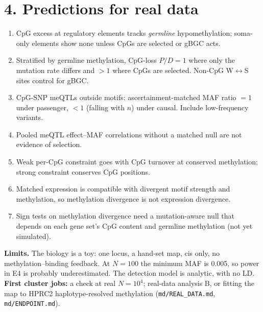 \documentclass[10pt]{article}
\begin{document}
\section*{4. Predictions for real data}
\begin{enumerate}[label=R\arabic*.]
\item CpG excess at regulatory elements tracks \emph{germline} hypomethylation; soma-only elements show none unless
  CpGs are selected or gBGC acts.
\item Stratified by germline methylation, CpG-loss $P/D=1$ where only the mutation rate differs and $>1$ where CpGs
  are selected. Non-CpG W$\leftrightarrow$S sites control for gBGC.
\item CpG-SNP meQTLs outside motifs: ascertainment-matched MAF ratio $=1$ under passenger, $<1$ (falling with $n$)
  under causal. Include low-frequency variants.
\item Pooled meQTL effect--MAF correlations without a matched null are not evidence of selection.
\item Weak per-CpG constraint goes with CpG turnover at conserved methylation; strong constraint conserves CpG
  positions.
\item Matched expression is compatible with divergent motif strength and methylation, so methylation divergence is
  not expression divergence.
\item Sign tests on methylation divergence need a mutation-aware null that depends on each gene set's CpG content and
  germline methylation (not yet simulated).
\end{enumerate}

\noindent\textbf{Limits.} The biology is a toy: one locus, a hand-set map, cis only, no methylation--binding
feedback. At $N=100$ the minimum MAF is 0.005, so power in E4 is probably underestimated. The detection model is
analytic, with no LD. \textbf{First cluster jobs:} a check at real $N=10^4$; real-data analysis B, or fitting the map
to HPRC2 haplotype-resolved methylation (\texttt{md/REAL\_DATA.md}, \texttt{md/ENDPOINT.md}).
\end{document}
